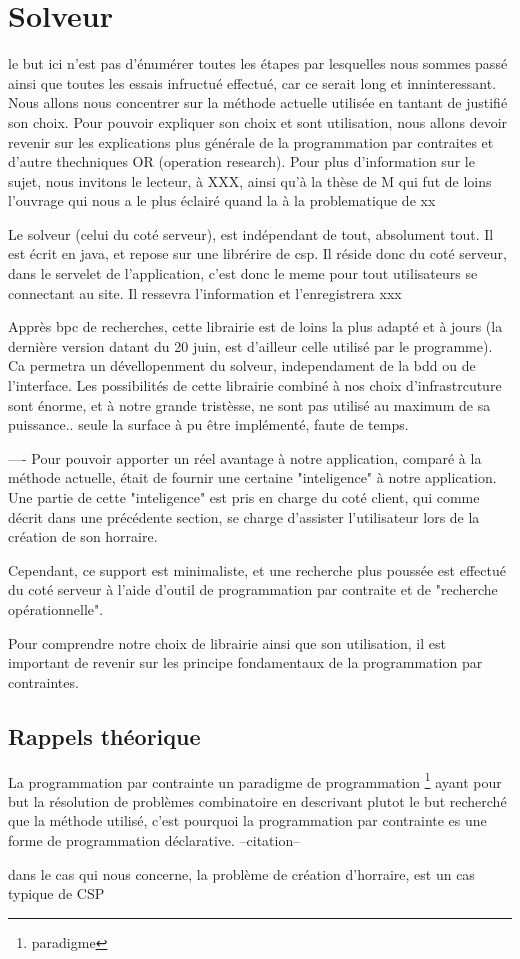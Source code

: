 \section{Solveur}
le but ici n'est pas d'énumérer toutes les étapes par lesquelles nous sommes passé ainsi que toutes les essais infructué effectué, car ce serait long et inninteressant. Nous allons nous concentrer sur la méthode actuelle utilisée en tantant de justifié son choix. Pour pouvoir expliquer son choix et sont utilisation, nous allons devoir revenir sur les explications plus générale de la programmation par contraites et d'autre thechniques OR (operation research).  Pour plus d'information sur le sujet, nous invitons le lecteur, à XXX, ainsi qu'à la thèse de M qui fut de loins l'ouvrage qui nous a le plus éclairé quand la à la problematique de xx

Le solveur (celui du coté serveur), est indépendant de tout, absolument tout. Il est écrit en java, et repose sur une librérire de csp. Il réside donc du coté serveur, dans le servelet de l'application, c'est donc le meme pour tout utilisateurs se connectant au  site. Il ressevra l'information et l'enregistrera xxx


Apprès bpc de recherches, cette librairie est de loins la plus adapté et à jours (la dernière version datant du 20 juin, est d'ailleur celle utilisé par le programme).  Ca permetra un dévellopenment du solveur, independament de la bdd ou de l'interface.
Les possibilités de cette librairie combiné à nos choix d'infrastrcuture sont énorme, et à notre grande tristèsse, ne sont pas utilisé au maximum de sa puissance..  seule la surface à pu être implémenté, faute de temps.

----
Pour pouvoir apporter un réel avantage à notre application, comparé à la méthode actuelle, était de fournir une certaine "inteligence" à notre application.
Une partie de cette "inteligence" est pris en charge du coté client, qui comme décrit dans une précédente section, se charge d'assister l'utilisateur lors de la création de son horraire.

Cependant, ce support est minimaliste, et une recherche plus poussée est effectué du coté serveur à l'aide d'outil de programmation par contraite et de "recherche opérationnelle".

Pour comprendre notre choix de librairie ainsi que son utilisation, il est important de revenir sur les principe fondamentaux de la programmation par contraintes.


\subsection{Rappels théorique}

La programmation par contrainte un paradigme de programmation \footnote{paradigme} ayant pour but la résolution de problèmes combinatoire en
descrivant plutot le but recherché que la méthode utilisé, c'est pourquoi la programmation par contrainte es une forme de programmation déclarative.
--citation--

dans le cas qui nous concerne, la problème de création d'horraire, est un cas typique de CSP
